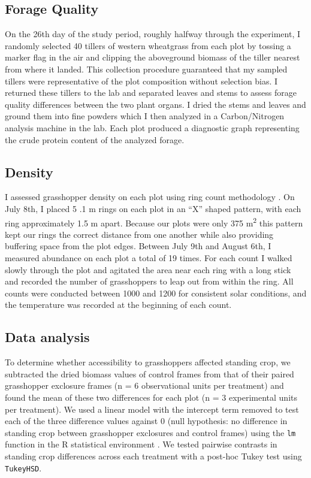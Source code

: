 \documentclass[referee, 
	            sn-basic]
           {sn-jnl}
\begin{document}
\begin{linenumbers}
\hypertarget{forage-quality}{%
\subsection{Forage Quality}\label{forage-quality}}

On the 26th day of the study period, roughly halfway through the
experiment, I randomly selected 40 tillers of western wheatgrass from
each plot by tossing a marker flag in the air and clipping the
aboveground biomass of the tiller nearest from where it landed. This
collection procedure guaranteed that my sampled tillers were
representative of the plot composition without selection bias. I
returned these tillers to the lab and separated leaves and stems to
assess forage quality differences between the two plant organs. I dried
the stems and leaves and ground them into fine powders which I then
analyzed in a Carbon/Nitrogen analysis machine in the lab. Each plot
produced a diagnostic graph representing the crude protein content of
the analyzed forage.

\hypertarget{density}{%
\subsection{Density}\label{density}}

I assessed grasshopper density on each plot using ring count methodology
\citep{onsager1977, joern2013}. On July 8th, I placed 5 .1 m rings on
each plot in an ``X'' shaped pattern, with each ring approximately 1.5 m
apart. Because our plots were only 375 m\textsuperscript{2} this pattern
kept our rings the correct distance from one another while also
providing buffering space from the plot edges. Between July 9th and
August 6th, I measured abundance on each plot a total of 19 times. For
each count I walked slowly through the plot and agitated the area near
each ring with a long stick and recorded the number of grasshoppers to
leap out from within the ring. All counts were conducted between 1000
and 1200 for consistent solar conditions, and the temperature was
recorded at the beginning of each count.

\hypertarget{data-analysis}{%
\subsection{Data analysis}\label{data-analysis}}

To determine whether accessibility to grasshoppers affected standing crop, we subtracted the dried biomass values of control frames from that of their paired grasshopper exclosure frames (n = 6 observational units per treatment) and found the mean of these two differences for each plot (n = 3 experimental units per treatment). 
We used a linear model with the intercept term removed to test each of the three difference values against 0 (null hypothesis: no difference in standing crop between grasshopper exclosures and control frames) using the \texttt{lm} function in the \textsf{R} statistical environment \citep{Rcore2020}. 
We tested pairwise contrasts in standing crop differences across each treatment with a post-hoc Tukey test using \texttt{TukeyHSD}.


\end{linenumbers}
\end{document}
